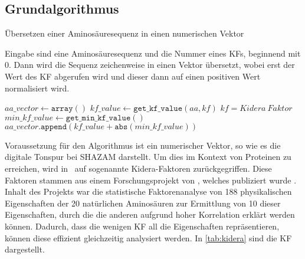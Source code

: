     \subsection{Grundalgorithmus} %
        \label{sub:grundalgorithmus}
        \begin{algorithm}[H]
            \caption{Übersetzen einer Aminosäuresequenz in einen numerischen Vektor}\label{alg:vorbereitung}
            Eingabe sind eine Aminosäuresequenz und die Nummer eines \acl{KF}s, beginnend mit 0. Dann wird die Sequenz zeichenweise in einen Vektor übersetzt, wobei erst der Wert des \ac{KF} abgerufen wird und dieser dann auf einen positiven Wert normalisiert wird.
            \newcommand{\I}{\text{\textquotesingle}}
            \begin{algorithmic}[1]

                \myRequire{
                    $sequence \in \{ \text{A-Z}, \I\Psi\I, \I\Omega\I, \I\Phi\I, \I\zeta\I, \I\Pi\I, \I\text{+}\I, \I\text{-}\I\}^{*} $\\
                    $0 \leq kf \leq 9$
                }

                \State $aa\_vector \gets \texttt{array}()$
                    \State $kf\_value \gets \texttt{get\_kf\_value}(aa, kf)$ \Comment $kf=Kidera\ Faktor$
                    \State $min\_kf\_value \gets \texttt{get\_min\_kf\_value}()$
                    \State $aa\_vector.\texttt{append}(kf\_value + \texttt{abs}(min\_kf\_value))$
                \EndFor
            \end{algorithmic}
        \end{algorithm}
        Voraussetzung für den Algorithmus ist ein numerischer Vektor, so wie es die digitale Tonspur bei SHAZAM darstellt. Um dies im Kontext von Proteinen zu erreichen, wird in \protfin\ auf sogenannte Kidera-Faktoren zurückgegriffen. Diese Faktoren stammen aus einem Forschungsprojekt von \citeauthor{kidera}, welches  publiziert wurde \autocite{kidera}. Inhalt des Projekts war die statistische Faktorenanalyse von 188 physikalischen Eigenschaften der 20 natürlichen Aminosäuren zur Ermittlung von 10 dieser Eigenschaften, durch die die anderen aufgrund hoher Korrelation erklärt werden können. Dadurch, dass die wenigen \ac{KF} all die Eigenschaften repräsentieren, können diese effizient gleichzeitig analysiert werden. In \autoref{tab:kidera} sind die \ac{KF} dargestellt.

